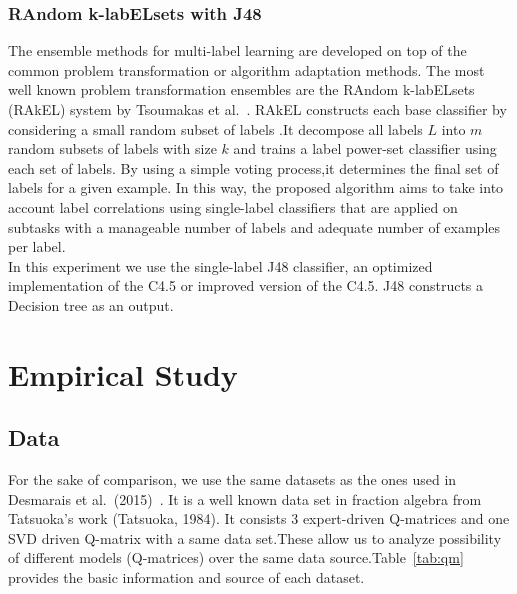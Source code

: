 \documentclass[11pt]{article}
\begin{document}
\subsubsection{RAndom k-labELsets with J48}
The ensemble methods for multi-label learning are developed on top of the common problem transformation or algorithm adaptation methods. The most well known problem transformation ensembles are the RAndom k-labELsets (RAkEL) system by Tsoumakas et al.~\cite{Tsoumakas2011random}. RAkEL constructs each base classifier by considering a small random subset of labels .It decompose all labels $L$ into $m$ random subsets of labels
with size $k$ and trains a label power-set classifier
using each set of labels. By using a simple voting process,it  determines the
final set of labels for a given example. In this way, the proposed algorithm aims to take into account label correlations using single-label classifiers that are applied on subtasks with a manageable number of labels and adequate number of examples per label. \\

In this experiment we use the single-label J48 classifier, an optimized  implementation of the  C4.5 or improved version of the  C4.5. J48 constructs a Decision tree as an output.  

\section{Empirical Study}

\subsection{Data}
For the sake of comparison, we use the same datasets as the ones used in Desmarais et al.\ (2015)~\cite{tatsuoka1983rule,desmarais2015combining}. It is a well known data set in
fraction algebra from Tatsuoka's work (Tatsuoka, 1984)\cite{tatsuoka1983rule}. It consists 3 expert-driven Q-matrices and one SVD driven Q-matrix with a same data set.These allow us to analyze possibility of different models (Q-matrices) over the same data source.Table~\ref{tab:qm} provides the basic information and source of each dataset.   
\end{document}
